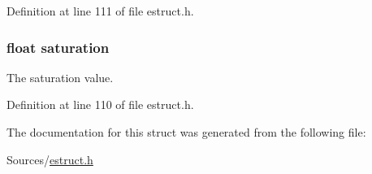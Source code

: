 Definition at line 111 of file estruct.\-h.

\hypertarget{struct__hsl_a953351912fb6da22fde59fe0f24909e7}{
\subsubsection[{saturation}]{\setlength{\rightskip}{0pt plus 5cm}float saturation}}\label{struct__hsl_a953351912fb6da22fde59fe0f24909e7}
The saturation value. 

Definition at line 110 of file estruct.\-h.



The documentation for this struct was generated from the following file\-:\begin{DoxyCompactItemize}
\item 
Sources/\hyperlink{estruct_8h}{estruct.\-h}\end{DoxyCompactItemize}
